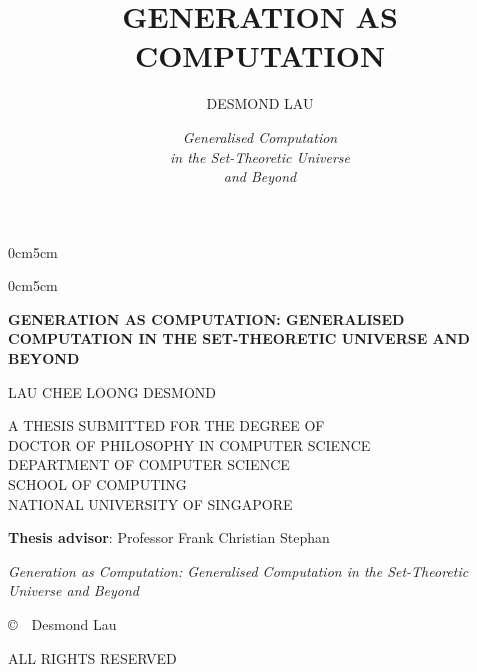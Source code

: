 \documentclass[12pt, twoside]{memoir}
\author{DESMOND LAU}
\title{GENERATION AS COMPUTATION}
\date{\textit{Generalised Computation \\ in the Set-Theoretic Universe \\ and Beyond}}
\makeatletter
\numberwithin{equation}{section}
\def\maketitle{%
  \null
  \thispagestyle{empty}%
  \vfill
  \begin{center}\leavevmode
    \normalfont
    {\LARGE \bfseries \raggedleft \@author\par}%
    \hrulefill\par
    {\huge  \raggedright 
    	\begin{changemargin}{0cm}{5cm} \@title
		\end{changemargin}}%
    {\LARGE  \raggedright 
    	\begin{changemargin}{0cm}{5cm} \@date
		\end{changemargin} \par}%
  \end{center}%
  \vfill
  \null
  \cleardoublepage
  }
\theoremstyle{definition}
\theoremstyle{remark}
\theoremstyle{definition}
\theoremstyle{definition}
\theoremstyle{definition}
\theoremstyle{remark}
\newcommand{\blankpage}{
\newpage
\thispagestyle{empty}
\mbox{}
\newpage
}
\makeatother
\begin{document}
\let\cleardoublepage\clearpage

\maketitle

\blankpage

\frontmatter

\clearpage
\thispagestyle{empty}

\null\vfill

\begin{center}
    \Large
    \textbf{GENERATION AS COMPUTATION: GENERALISED COMPUTATION IN THE SET-THEORETIC UNIVERSE AND BEYOND}

    \vspace{2cm}

    \Large
    LAU CHEE LOONG DESMOND

    \vspace{2cm}

    \large
    \textbf{\the\year}

    \vspace{2cm}

    \normalsize
    A THESIS SUBMITTED FOR THE DEGREE OF \\
    DOCTOR OF PHILOSOPHY IN COMPUTER SCIENCE \\
    \vspace{1em}
    DEPARTMENT OF COMPUTER SCIENCE \\
    SCHOOL OF COMPUTING \\
    NATIONAL UNIVERSITY OF SINGAPORE \\

    \vspace{2cm}

    \large
    \textbf{Thesis advisor}: Professor Frank Christian Stephan
\end{center}
\vfill\null

\clearpage
\null\vfill

\begin{flushleft}
\textit{Generation as Computation: Generalised Computation in the Set-Theoretic Universe and Beyond} 

\medskip

\copyright \ \the\year \ Desmond Lau

\bigskip

ALL RIGHTS RESERVED

\end{flushleft}

\clearpage
\thispagestyle{plain}
\end{document}
